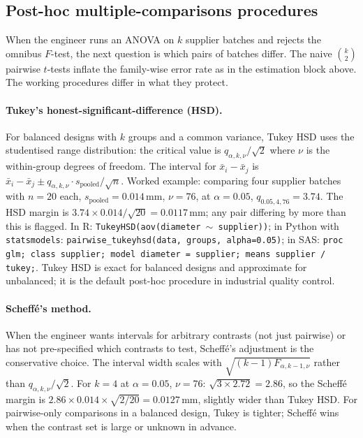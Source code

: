 \subsection{Post-hoc multiple-comparisons procedures}

When the engineer runs an ANOVA on $k$ supplier batches and
rejects the omnibus $F$-test, the next question is which pairs
of batches differ. The naive $\binom{k}{2}$ pairwise
$t$-tests inflate the family-wise error rate as in the
estimation block above. The working procedures differ in what
they protect.

\paragraph{Tukey's honest-significant-difference (HSD).} For
balanced designs with $k$ groups and a common variance, Tukey
HSD uses the studentised range distribution: the critical
value is $q_{\alpha, k, \nu}/\sqrt{2}$ where $\nu$ is the
within-group degrees of freedom. The interval for
$\bar{x}_{i} - \bar{x}_{j}$ is
$\bar{x}_{i} - \bar{x}_{j} \pm q_{\alpha, k, \nu} \cdot
s_{\text{pooled}}/\sqrt{n}$. Worked example: comparing four
supplier batches with $n = 20$ each, $s_{\text{pooled}} = 0.014
\,\si{\milli\meter}$, $\nu = 76$, at $\alpha = 0.05$,
$q_{0.05, 4, 76} = 3.74$. The HSD margin is
$3.74 \times 0.014 /\sqrt{20} = 0.0117\,\si{\milli\meter}$;
any pair differing by more than this is flagged. In R:
\texttt{TukeyHSD(aov(diameter $\sim$ supplier))}; in Python
with \texttt{statsmodels}:
\texttt{pairwise\_tukeyhsd(data, groups, alpha=0.05)}; in SAS:
\texttt{proc glm; class supplier; model diameter = supplier;
means supplier / tukey;}. Tukey HSD is exact for balanced
designs and approximate for unbalanced; it is the default
post-hoc procedure in industrial quality control.

\paragraph{Scheffé's method.} When the engineer wants
intervals for arbitrary contrasts (not just pairwise) or has
not pre-specified which contrasts to test, Scheffé's
adjustment is the conservative choice. The interval width
scales with $\sqrt{(k - 1)F_{\alpha, k-1, \nu}}$ rather than
$q_{\alpha, k, \nu}/\sqrt{2}$. For $k = 4$ at
$\alpha = 0.05$, $\nu = 76$: $\sqrt{3 \times 2.72} = 2.86$, so
the Scheffé margin is $2.86 \times 0.014 \times \sqrt{2/20}
= 0.0127\,\si{\milli\meter}$, slightly wider than Tukey HSD.
For pairwise-only comparisons in a balanced design, Tukey is
tighter; Scheffé wins when the contrast set is large or
unknown in advance.

